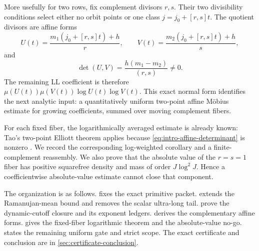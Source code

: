 More usefully for two rows, fix complement divisors \(r,s\).  Their two
divisibility conditions select either no orbit points or one class
\(j=j_0+[r,s]t\).  The quotient divisors are affine forms
\[
 U(t)=\frac{m_1(j_0+[r,s]t)+h}{r},\qquad
 V(t)=\frac{m_2(j_0+[r,s]t)+h}{s},
\]
and
\begin{equation}
 \det(U,V)=\frac{h(m_1-m_2)}{(r,s)}\ne0.
 \label{eq:intro-affine-determinant}
\end{equation}
The remaining LL coefficient is therefore
\(\mu(U(t))\mu(V(t))\log U(t)\log V(t)\).  This exact normal form
identifies the next analytic input: a quantitatively uniform two-point
affine M\"obius estimate for growing coefficients, summed over moving
complement fibers.

For each fixed fiber, the logarithmically averaged estimate is already
known: Tao's two-point Elliott theorem applies because
\eqref{eq:intro-affine-determinant} is nonzero
\citep{Tao2016}.  We record the corresponding log-weighted corollary
and a finite-complement reassembly.  We also prove that the absolute
value of the \(r=s=1\) fiber has positive squarefree density and mass
of order \(J\log^2J\).  Hence a coefficientwise absolute-value estimate
cannot close that component.

The organization is as follows.   fixes the exact
primitive packet.   extends the Ramanujan-mean
bound and removes the scalar ultra-long tail.
 prove the dynamic-cutoff
closure and its exponent ledgers.   derives
the complementary affine forms.   gives
the fixed-fiber logarithmic theorem and the absolute-value no-go.
 states the remaining uniform gate and strict
scope.  The exact certificate and conclusion are in
\cref{sec:certificate-conclusion}.
